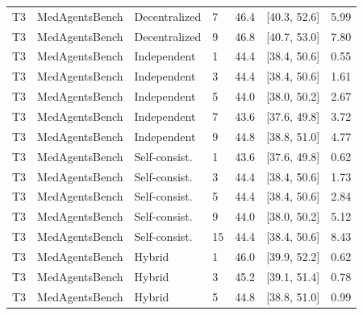 \begin{table}[t]
\begin{tabular}{@{}llllrrr@{}}
T3 & MedAgentsBench & Decentralized & 7 & 46.4 & [40.3, 52.6] & 5.99 \\
T3 & MedAgentsBench & Decentralized & 9 & 46.8 & [40.7, 53.0] & 7.80 \\
T3 & MedAgentsBench & Independent & 1 & 44.4 & [38.4, 50.6] & 0.55 \\
T3 & MedAgentsBench & Independent & 3 & 44.4 & [38.4, 50.6] & 1.61 \\
T3 & MedAgentsBench & Independent & 5 & 44.0 & [38.0, 50.2] & 2.67 \\
T3 & MedAgentsBench & Independent & 7 & 43.6 & [37.6, 49.8] & 3.72 \\
T3 & MedAgentsBench & Independent & 9 & 44.8 & [38.8, 51.0] & 4.77 \\
T3 & MedAgentsBench & Self-consist. & 1 & 43.6 & [37.6, 49.8] & 0.62 \\
T3 & MedAgentsBench & Self-consist. & 3 & 44.4 & [38.4, 50.6] & 1.73 \\
T3 & MedAgentsBench & Self-consist. & 5 & 44.4 & [38.4, 50.6] & 2.84 \\
T3 & MedAgentsBench & Self-consist. & 9 & 44.0 & [38.0, 50.2] & 5.12 \\
T3 & MedAgentsBench & Self-consist. & 15 & 44.4 & [38.4, 50.6] & 8.43 \\
T3 & MedAgentsBench & Hybrid & 1 & 46.0 & [39.9, 52.2] & 0.62 \\
T3 & MedAgentsBench & Hybrid & 3 & 45.2 & [39.1, 51.4] & 0.78 \\
T3 & MedAgentsBench & Hybrid & 5 & 44.8 & [38.8, 51.0] & 0.99 \\
\bottomrule
\end{tabular}
\end{table}

